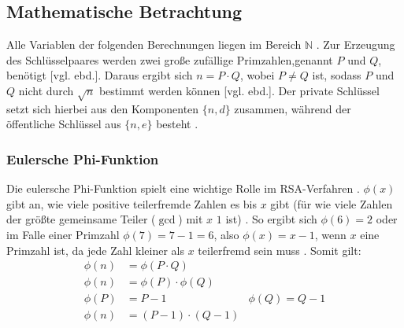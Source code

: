 \documentclass[a4paper,ngerman, headheight=28pt,12pt, footheight=27pt]{scrartcl}
\newcommand{\vcite}[1]{\cite[vgl.][]{#1}}
\newcommand{\vebd}{[vgl. ebd.]}
\begin{document}
\subsection{Mathematische Betrachtung}
Alle Variablen der folgenden Berechnungen liegen im Bereich $\mathbb{N}$ \vcite{RsaGenCond}. Zur Erzeugung des Schlüsselpaares werden zwei große zufällige Primzahlen,genannt $P$ und $Q$, benötigt \vebd. Daraus ergibt sich $n = P \cdot Q$, wobei $P \neq Q$ ist, sodass $P$ und $Q$ nicht durch $\sqrt{n}$ bestimmt werden können \vebd. Der private Schlüssel setzt sich hierbei aus den Komponenten $\{ n, d \}$ zusammen, während der öffentliche Schlüssel aus $\{ n, e \}$ besteht \vcite{RsaVariables}.
\subsubsection{Eulersche Phi-Funktion}
Die eulersche Phi-Funktion spielt eine wichtige Rolle im RSA-Verfahren \vcite{TotientFuncMultiplicative}. $\phi(x)$ gibt an, wie viele positive teilerfremde Zahlen es bis $x$ gibt (für wie viele Zahlen der größte gemeinsame Teiler ($\gcd$) mit $x$ $1$ ist) \vcite{EulersTotientFunction}. So ergibt sich $\phi(6) = 2$ oder im Falle einer Primzahl $\phi(7) = 7 - 1 = 6$, also $\phi(x) = x-1$, wenn $x$ eine Primzahl ist, da jede Zahl kleiner als $x$ teilerfremd sein muss \vcite{TotientFuncMultiplicative}. Somit gilt:
\begin{equation*}
  \begin{aligned}
    \phi(n) & = \phi(P \cdot Q)                                                \\
    \phi(n) & = \phi(P) \cdot \phi(Q)                                          \\
    \phi(P) & = P -1                                          & \phi(Q) = Q -1 \\
    \phi(n) & = \left(P - 1 \right) \cdot \left( Q - 1\right)
  \end{aligned}
\end{equation*}
\end{document}
